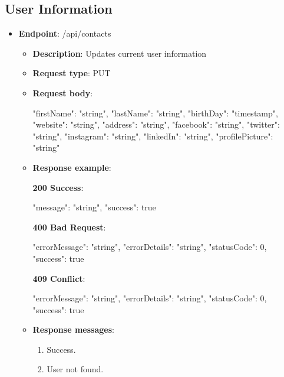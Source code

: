 \subsection{User Information}
\begin{itemize}
    \item \textbf{Endpoint}: /api/contacts
    \begin{itemize}
        \item \textbf{Description}: Updates current user information
        \item \textbf{Request type}: PUT
        \item \textbf{Request body}:
        \begin{spverbatim}
        {
            "firstName": "string",
            "lastName": "string",
            "birthDay": "timestamp",
            "website": "string",
            "address": "string",
            "facebook": "string",
            "twitter": "string",
            "instagram": "string",
            "linkedIn": "string",
            "profilePicture": "string"
        }
        \end{spverbatim}

        \item \textbf{Response example}:

        \textbf{200 Success}:

        \begin{spverbatim}
        {
            "message": "string",
            "success": true
        }
        \end{spverbatim}

        \textbf{400 Bad Request}:

        \begin{spverbatim}
        {
            "errorMessage": "string",
            "errorDetails": "string",
            "statusCode": 0,
            "success": true
        }
        \end{spverbatim}

        \textbf{409 Conflict}:

        \begin{spverbatim}
        {
            "errorMessage": "string",
            "errorDetails": "string",
            "statusCode": 0,
            "success": true
        }
        \end{spverbatim}

        \item \textbf{Response messages}:
        \begin{enumerate}
            \item Success.
            \item User not found.
        \end{enumerate}
    \end{itemize}
\end{itemize}